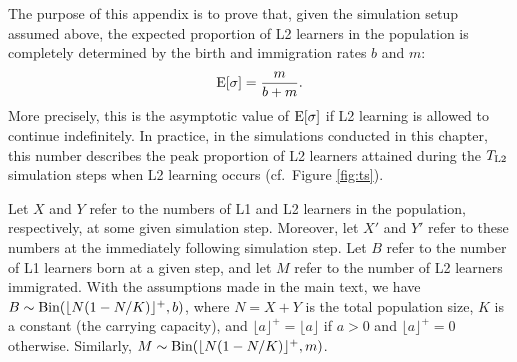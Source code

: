 The purpose of this appendix is to prove that, given the simulation
setup assumed above, the expected proportion of L2 learners in the
population is completely determined by the birth and immigration rates
\(b\) and \(m\): \[
\textnormal{E}[\sigma] = \frac{m}{b + m}.
\] More precisely, this is the asymptotic value of
\(\textnormal{E}[\sigma]\) if L2 learning is allowed to continue
indefinitely. In practice, in the simulations conducted in this chapter,
this number describes the peak proportion of L2 learners attained during
the \(T_\textnormal{L2}\) simulation steps when L2 learning occurs
(cf.~Figure \ref{fig:ts}).

Let \(X\) and \(Y\) refer to the numbers of L1 and L2 learners in the
population, respectively, at some given simulation step. Moreover, let
\(X'\) and \(Y'\) refer to these numbers at the immediately following
simulation step. Let \(B\) refer to the number of L1 learners born at a
given step, and let \(M\) refer to the number of L2 learners immigrated.
With the assumptions made in the main text, we have
\(B \sim \textnormal{Bin}(\lfloor N(1 - N/K) \rfloor^+, b)\), where
\(N = X+Y\) is the total population size, \(K\) is a constant (the
carrying capacity), and \(\lfloor a \rfloor^+ = \lfloor a \rfloor\) if
\(a > 0\) and \(\lfloor a \rfloor^+ = 0\) otherwise. Similarly,
\(M \sim \textnormal{Bin}(\lfloor N(1 - N/K) \rfloor^+, m)\).

